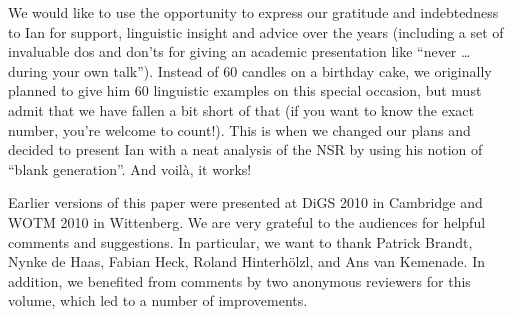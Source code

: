 \documentclass[output=paper]{langsci/langscibook}
\begin{document}
We would like to use the opportunity to express our gratitude and indebtedness
to Ian for support, linguistic insight and advice over the years (including a
set of invaluable dos and don'ts for giving an academic presentation like
``never \dots{} during your own talk''). Instead of 60 candles on a birthday
cake, we originally planned to give him 60 linguistic examples on this special
occasion, but must admit that we have fallen a bit short of that (if you want
to know the exact number, you're welcome to count!). This is when we changed
our plans and decided to present Ian with a neat analysis of the
\gls{NSR} by using his notion of ``blank
generation''. And voilà, it works!

Earlier versions of this paper were presented at DiGS 2010 in Cambridge and
WOTM 2010 in Wittenberg. We are very grateful to the audiences for helpful
comments and suggestions. In particular, we want to thank Patrick Brandt, Nynke
de Haas, Fabian Heck, Roland Hinterhölzl, and Ans van Kemenade. In addition, we
benefited from comments by two anonymous reviewers for this volume, which led
to a number of improvements.

{\sloppy
\printbibliography[heading=subbibliography,notkeyword=this]
}
\end{document}
